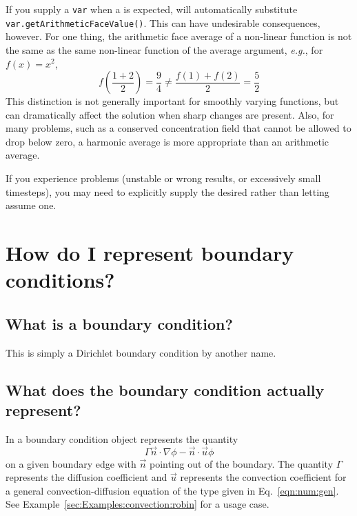     
    \begin{reSTadmonition}[Note]
        If you supply a  \verb+var+ when a
         is expected, \FiPy{} will automatically
        substitute \verb+var.getArithmeticFaceValue()+.  This can have
        undesirable consequences, however. For one thing, the 
        arithmetic face average of a non-linear function is not the 
        same as the same non-linear function of the average argument, 
        \emph{e.g.}, for $f(x) = x^2$,
        \[ f(\frac{1+2}{2}) = \frac{9}{4} \neq 
        \frac{f(1) + f(2)}{2} = \frac{5}{2} \]
        This distinction is not generally important for smoothly
        varying functions, but can dramatically affect the solution
        when sharp changes are present.  Also, for many problems, such
        as a conserved concentration field that cannot be allowed to
        drop below zero, a harmonic average is more appropriate than
        an arithmetic average.
        
        If you experience problems (unstable or wrong results, or 
        excessively small timesteps), you may need to explicitly supply the 
        desired  rather than letting \FiPy{} 
        assume one.
    \end{reSTadmonition}

    \section{How do I represent boundary conditions?}  

    \subsection{What is a  boundary condition?}

    This is simply a Dirichlet boundary condition by another name.
    
    \subsection{What does the  boundary condition actually represent?}

    In \FiPy{} a  boundary condition object represents the
    quantity $$ \Gamma \vec{n} \cdot \nabla \phi - \vec{n} \cdot \vec{u} \phi $$
    on a given boundary edge with $\vec{n}$ pointing out of the boundary. The
    quantity $\Gamma$ represents the diffusion coefficient and $\vec{u}$
    represents the convection coefficient for a general convection-diffusion
    equation of the type given in Eq.~\eqref{eqn:num:gen}. See
    Example~\ref{sec:Examples:convection:robin} for a usage case.

